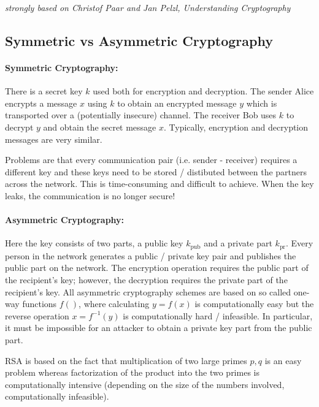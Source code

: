 
\emph{strongly based on Christof Paar and Jan Pelzl, Understanding Cryptography}

\subsection{Symmetric vs Asymmetric Cryptography}

\paragraph{Symmetric Cryptography:} There is a secret key $k$ used both for encryption and decryption. The sender Alice encrypts a message $x$ using $k$ to obtain an encrypted message $y$ which is transported over a (potentially insecure) channel. The receiver Bob uses $k$ to decrypt $y$ and obtain the secret message $x$. Typically, encryption and decryption messages are very similar.

Problems are that every communication pair (i.e. sender - receiver) requires a different key and these keys need to be stored / distibuted between the partners across the network. This is time-consuming and difficult to achieve. When the key leaks, the communication is no longer secure!

\paragraph{Asymmetric Cryptography:} Here the key consists of two parts, a public key $k_{\text{pub}}$ and a private part $k_{\text{pr}}$. Every person in the network generates a public / private key pair and publishes the public part on the network. The encryption operation requires the public part of the recipient's key; however, the decryption requires the private part of the recipient's key. All asymmetric cryptography schemes are based on so called one-way functions $f()$, where calculating $y = f(x)$ is computationally easy but the reverse operation $x = f^{-1}(y)$ is computationally hard / infeasible. In particular, it must be impossible for an attacker to obtain a private key part from the public part.

RSA is based on the fact that multiplication of two large primes $p, q$ is an easy problem whereas factorization of the product into the two primes is computationally intensive (depending on the size of the numbers involved, computationally infeasible).

